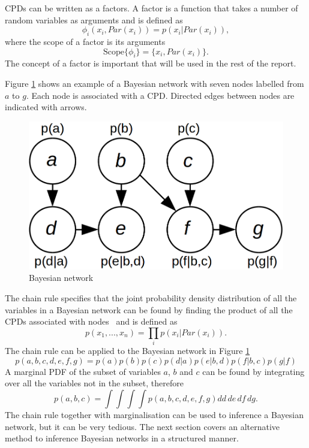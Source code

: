 \documentclass[12pt,oneside,openany,a4paper, %
afrikaans,english,
]{memoir}
\numberwithin{equation}{chapter}
\begin{document}
CPDs can be written as a factors. A factor is a function that takes a number of random variables as arguments and is defined as
\begin{equation}
\phi_i(x_i, Par(x_i)) = p(x_i|Par(x_i)),
\end{equation}
where the scope of a factor is its arguments 
\begin{equation}
\text{Scope}\{\phi_i\} = \{x_i, Par(x_i)\}.
\end{equation}
The concept of a factor is important that will be used in the rest of the report.

Figure \ref{fig:bays_pgm} shows an example of a Bayesian network with seven nodes labelled from $a$ to $g$. Each node is associated with a CPD. Directed edges between nodes are indicated with arrows.
\begin{figure}[H]
  \includegraphics[width=0.5\linewidth]{Figures/bayesian_pgm.png}
  \centering
  \caption{Bayesian network}
  \label{fig:bays_pgm}
\end{figure}
The chain rule specifies that the joint probability density distribution of all the variables in a Bayesian network can be found by finding the product of all the CPDs associated with nodes~\citep{koller} and is defined as
\begin{equation}
p(x_1, ..., x_n) = \prod_i p(x_i|Par(x_i)).
\end{equation}
The chain rule can be applied to the Bayesian network in Figure \ref{fig:bays_pgm}
\begin{equation}
p(a,b,c,d,e,f,g) = p(a)p(b)p(c)p(d|a)p(e|b,d)p(f|b,c)p(g|f)
\end{equation}
A marginal PDF of the subset of variables $a$, $b$ and $c$ can be found by integrating over all the variables not in the subset, therefore
\begin{equation}
p(a,b,c) = \int\int\int\int p(a,b,c,d,e,f,g)dd\,de\,df\,dg.
\end{equation}
The chain rule together with marginalisation can be used to inference a Bayesian network, but it can be very tedious. The next section covers an alternative method to inference Bayesian networks in a structured manner.
\end{document}
